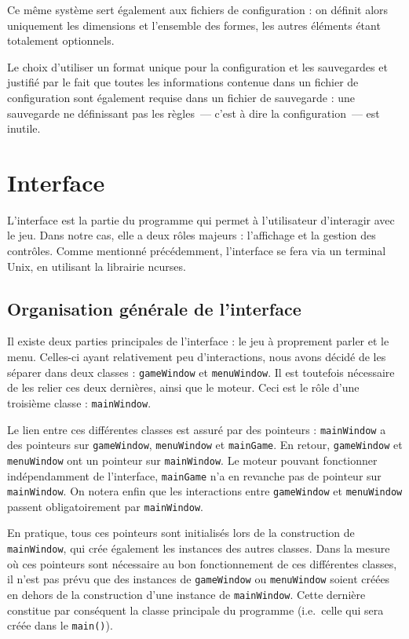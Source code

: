 \documentclass[11pt,a4paper]{article}
\begin{document}
Ce même système sert également aux fichiers de configuration : on définit alors uniquement les dimensions et l'ensemble des formes, les autres éléments étant totalement optionnels.

Le choix d'utiliser un format unique pour la configuration et les sauvegardes et justifié par le fait que toutes les informations contenue dans un fichier de configuration sont également requise dans un fichier de sauvegarde : une sauvegarde ne définissant pas les règles~--- c'est à dire la configuration~--- est inutile.


\section{Interface}
L'interface est la partie du programme qui permet à l'utilisateur d'interagir avec le jeu. Dans notre cas, elle a deux rôles majeurs : l'affichage et la gestion des contrôles. Comme mentionné précédemment, l'interface se fera via un terminal Unix, en utilisant la librairie ncurses.

\subsection{Organisation générale de l'interface}
Il existe deux parties principales de l'interface : le jeu à proprement parler et le menu. Celles-ci ayant relativement peu d'interactions, nous avons décidé de les séparer dans deux classes : \verb"gameWindow" et \verb"menuWindow". Il est toutefois nécessaire de les relier ces deux dernières, ainsi que le moteur. Ceci est le rôle d'une troisième classe : \verb"mainWindow".

Le lien entre ces différentes classes est assuré par des pointeurs : \verb"mainWindow" a des pointeurs sur \verb"gameWindow", \verb"menuWindow" et \verb"mainGame". En retour, \verb"gameWindow" et \verb"menuWindow" ont un pointeur sur \verb"mainWindow". Le moteur pouvant fonctionner indépendamment de l'interface, \verb"mainGame" n'a en revanche pas de pointeur sur \verb"mainWindow". On notera enfin que les interactions entre \verb"gameWindow" et \verb"menuWindow" passent obligatoirement par \verb"mainWindow".

En pratique, tous ces pointeurs sont initialisés lors de la construction de \verb"mainWindow", qui crée également les instances des autres classes. Dans la mesure où ces pointeurs sont nécessaire au bon fonctionnement de ces différentes classes, il n'est pas prévu que des instances de \verb"gameWindow" ou \verb"menuWindow" soient créées en dehors de la construction d'une instance de \verb"mainWindow". Cette dernière constitue par conséquent la classe principale du programme (i.e.\ celle qui sera créée dans le \verb"main()").
\end{document}
